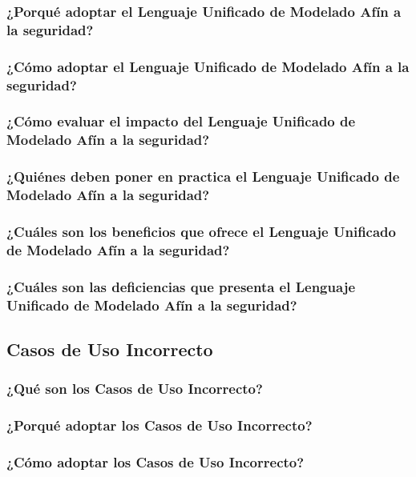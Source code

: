 \documentclass[runningheads,a4paper]{llncs}
\begin{document}
\subsubsection{¿Porqué adoptar el Lenguaje Unificado de Modelado Afín a la seguridad?}

\subsubsection{¿Cómo adoptar el Lenguaje Unificado de Modelado Afín a la seguridad?}

\subsubsection{¿Cómo evaluar el impacto del Lenguaje Unificado de Modelado Afín a la seguridad?}

\subsubsection{¿Quiénes deben poner en practica el Lenguaje Unificado de Modelado Afín a la seguridad?}

\subsubsection{¿Cuáles son los beneficios que ofrece el Lenguaje Unificado de Modelado Afín a la seguridad?}

\subsubsection{¿Cuáles son las deficiencias que presenta el Lenguaje Unificado de Modelado Afín a la seguridad?}


\subsection{Casos de Uso Incorrecto}

\subsubsection{¿Qué son los Casos de Uso Incorrecto?}

\subsubsection{¿Porqué adoptar los Casos de Uso Incorrecto?}

\subsubsection{¿Cómo adoptar los Casos de Uso Incorrecto?}
\end{document}
